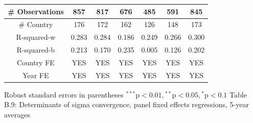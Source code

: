 \documentclass[10pt]{article}
\begin{document}
\begin{center}
\begin{tabular}{|c|c|c|c|c|c|c|}
\hline
\# Observations & 857 & 817 & 676 & 485 & 591 & 845 \\
\hline
\# Country & 176 & 172 & 162 & 126 & 148 & 173 \\
\hline
R-squared-w & 0.283 & 0.284 & 0.186 & 0.249 & 0.266 & 0.300 \\
\hline
R-squared-b & 0.213 & 0.170 & 0.235 & 0.005 & 0.126 & 0.202 \\
\hline
Country FE & YES & YES & YES & YES & YES & YES \\
\hline
Year FE & YES & YES & YES & YES & YES & YES \\
\hline
\end{tabular}
\end{center}

Robust standard errors in parentheses ${ }^{* * *} \mathrm{p}<0.01,{ }^{* *} \mathrm{p}<0.05,{ }^{*} \mathrm{p}<0.1$ Table B.9: Determinants of sigma convergence, panel fixed effects regressions, 5-year averages
\end{document}
